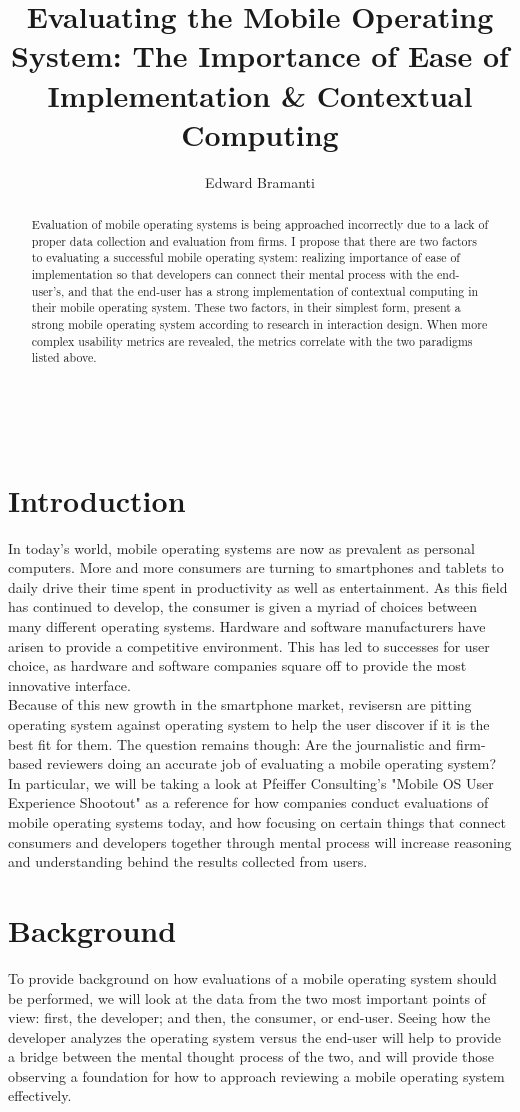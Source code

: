 \documentclass[11pt]{article}
\title{Evaluating the Mobile Operating System: The Importance of Ease of Implementation \& Contextual Computing}
\author{Edward Bramanti}
\begin{document}
\maketitle\
\begin{abstract}
Evaluation of mobile operating systems is being approached incorrectly due to a lack of proper data collection and evaluation from firms. I propose that there are two factors to evaluating a successful mobile operating system: realizing importance of ease of implementation so that developers can connect their mental process with the end-user's, and that the end-user has a strong implementation of contextual computing in their mobile operating system. These two factors, in their simplest form, present a strong mobile operating system according to research in interaction design. When more complex usability metrics are revealed, the metrics correlate with the two paradigms listed above.
\end{abstract}
\pagebreak
\section{Introduction}
In today's world, mobile operating systems are now as prevalent as personal computers. More and more consumers are turning to smartphones and tablets to daily drive their time spent in productivity as well as entertainment. As this field has continued to develop, the consumer is given a myriad of choices between many different operating systems. Hardware and software manufacturers have arisen to provide a competitive environment. This has led to successes for user choice, as hardware and software companies square off to provide the most innovative interface.\\
\indent Because of this new growth in the smartphone market, revisersn are pitting operating system against operating system to help the user discover if it is the best fit for them. The question remains though: Are the journalistic and firm-based reviewers doing an accurate job of evaluating a mobile operating system? In particular, we will be taking a look at Pfeiffer Consulting's "Mobile OS User Experience Shootout" as a reference for how companies conduct evaluations of mobile operating systems today, and how focusing on certain things that connect consumers and developers together through mental process will increase reasoning and understanding behind the results collected from users.

\section{Background}
\label{background}
To provide background on how evaluations of a mobile operating system should be performed, we will look at the data from the two most important points of view: first, the developer; and then, the consumer, or end-user. Seeing how the developer analyzes the operating system versus the end-user will help to provide a bridge between the mental thought process of the two, and will provide those observing a foundation for how to approach reviewing a mobile operating system effectively.
\end{document}
